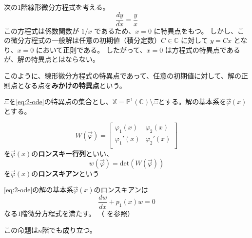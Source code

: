 \begin{example}[見掛けの特異点の例]\label{ex:apparent_singularity}
    次の1階線形微分方程式を考える。
    \begin{equation}\label{eq:apparent_ex}
    \frac{dy}{dx}=\frac{y}{x}
    \end{equation}
    この方程式は係数関数が $1/x$ であるため、$x=0$ に特異点をもつ。
    しかし、この微分方程式の一般解は任意の初期値（積分定数）$C \in \mathbb{C}$ に対して $y=Cx$ となり、$x=0$ において正則である。
    したがって、$x=0$ は方程式の特異点であるが、解の特異点とはならない。
\end{example}

\begin{definition}
    このように、線形微分方程式の特異点であって、任意の初期値に対して、解の正則点となる点を\textbf{みかけの特異点}という。
\end{definition}


$\Xi$を\eqref{eq:2-ode}の特異点の集合とし、$\mathbb{X}=\mathbb{P}^{1}(\mathbb{C})\setminus\Xi$とする。解の基本系を$\vec{\varphi}(x)$とする。

\begin{definition}
    \[
    W(\vec{\varphi})=
    \left[
    \begin{matrix}
        \varphi_{1}(x) & \varphi_{2}(x) \\
        \varphi_{1}'(x) & \varphi_{2}'(x) \\
    \end{matrix}
    \right]
    \]
    を$\vec{\varphi}(x)$の\textbf{ロンスキー行列}といい、
    \[
    w(\vec{\varphi})=\text{det}(W(\vec{\varphi}))
    \]
    を$\vec{\varphi}(x)$の\textbf{ロンスキアン}という
\end{definition}

\begin{proposition}\label{prop:wronskian-ode}
    \eqref{eq:2-ode}の解の基本系$\vec{\varphi}(x)$のロンスキアンは
    \[
    \frac{dw}{dx}+p_{1}(x)w=0
    \]
    なる$1$階微分方程式を満たす。
    （\cite[p.51 命題2.2]{book:okamoto} を参照）
\end{proposition}

この命題は$n$階でも成り立つ。

